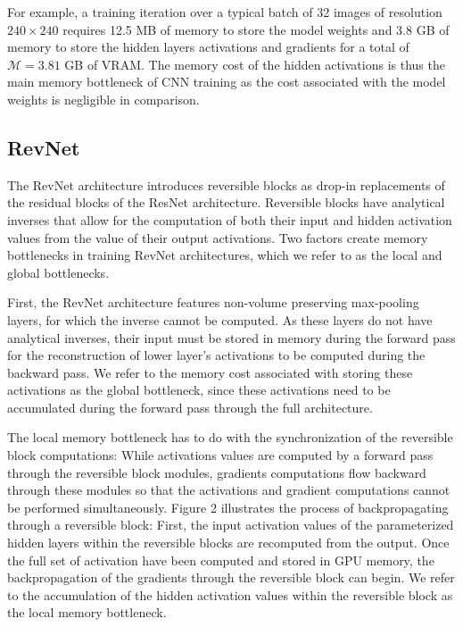 \documentclass[twocolumn]{bmcart}
\begin{document}
For example, a training iteration over a typical batch of 32 images of resolution $240 \times 240$ 
requires 12.5 MB of memory to store the model weights and 3.8 GB of memory to store the hidden layers activations and gradients
for a total of $\mathcal{M}=3.81$ GB of VRAM.
The memory cost of the hidden activations is thus the main memory bottleneck of CNN training as the cost associated with 
the model weights is negligible in comparison.

\subsection{RevNet}
The RevNet architecture introduces reversible blocks as drop-in replacements of the residual blocks of the ResNet architecture.
Reversible blocks have analytical inverses that allow for the computation of both their input and hidden activation values from the value of their output activations.
Two factors create memory bottlenecks in training RevNet architectures, which we refer to as the local and global bottlenecks.

First, the RevNet architecture features non-volume preserving max-pooling layers, for which the inverse cannot be computed.
As these layers do not have analytical inverses, their input must be stored in memory during the forward pass 
for the reconstruction of lower layer's activations to be computed during the backward pass. 
We refer to the memory cost associated with storing these activations as the global bottleneck, 
since these activations need to be accumulated during the forward pass through the full architecture.

The local memory bottleneck has to do with the synchronization of the reversible block computations:
While activations values are computed by a forward pass through the reversible block modules,
gradients computations flow backward through these modules so that the activations and gradient 
computations cannot be performed simultaneously.
Figure 2 illustrates the process of backpropagating through a reversible block:
First, the input activation values of the parameterized hidden layers within the reversible blocks are recomputed from the output.
Once the full set of activation have been computed and stored in GPU memory, the backpropagation of the gradients through the reversible block can begin.
We refer to the accumulation of the hidden activation values within the reversible block as the local memory bottleneck.
\end{document}
